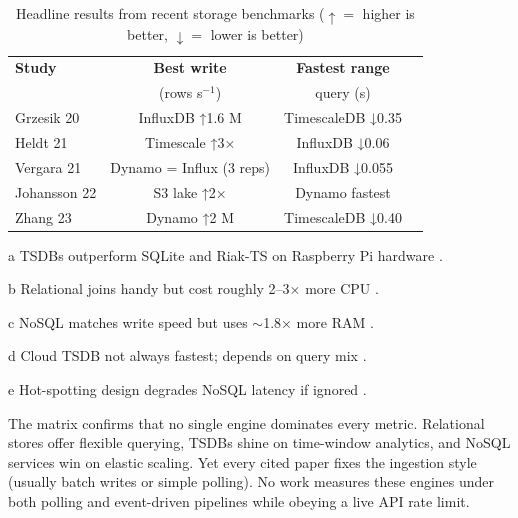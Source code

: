 \documentclass[nomenclature, english, biblatex]{kththesis}
\numberwithin{listing}{chapter}
\begin{document}
\begin{table}[htbp]
 \centering
 \begin{threeparttable}
 \caption{Headline results from recent storage benchmarks
   (\(\uparrow\!=\) higher is better,\; \(\downarrow\!=\) lower is better)}
 \label{tab:storage-matrix}
 \begin{tabularx}{\linewidth}{@{} l c c c @{}}
 \toprule
 \textbf{Study} & \textbf{Best write} & \textbf{Fastest range} \\[-2pt]
     & (rows s\(^{-1}\)) & query (s)    &    \\
 \midrule
 Grzesik 20\tnote{a} & InfluxDB ↑1.6 M & TimescaleDB ↓0.35 \\[2pt]
 Heldt 21\tnote{b} & Timescale ↑3× & InfluxDB ↓0.06 \\[2pt]
 Vergara 21\tnote{c} & Dynamo = Influx (3 reps) & InfluxDB ↓0.055 \\[2pt]
 Johansson 22\tnote{d}& S3 lake ↑2× & Dynamo fastest \\[2pt]
 Zhang 23\tnote{e} & Dynamo ↑2 M  & TimescaleDB ↓0.40 \\
 \bottomrule
 \end{tabularx}
 \begin{tablenotes}[flushleft]\footnotesize
 \item[a] TSDBs outperform SQLite and Riak-TS on Raspberry Pi hardware \cite{Grzesik2020EdgeIoTBenchmark}.
 \item[b] Relational joins handy but cost roughly 2–3× more CPU \cite{Heldt2021SciTS}.
 \item[c] NoSQL matches write speed but uses \(\sim\)1.8× more RAM \cite{Vergara2021PerformanceTSDB}.
 \item[d] Cloud TSDB not always fastest; depends on query mix \cite{Johansson2022AWSCloudData}.
 \item[e] Hot-spotting design degrades NoSQL latency if ignored \cite{Zhang2023EdgeTSDB}.
 \end{tablenotes}
 \end{threeparttable}
\end{table}


\noindent
The matrix confirms that no single engine dominates every metric. 
Relational stores offer flexible querying, \glspl{TSDB} shine on time-window analytics, and NoSQL services win on elastic scaling. 
Yet every cited paper fixes the ingestion style (usually batch writes or simple polling). No work measures these engines under both polling and event-driven pipelines while obeying a live API rate limit. 
\end{document}
